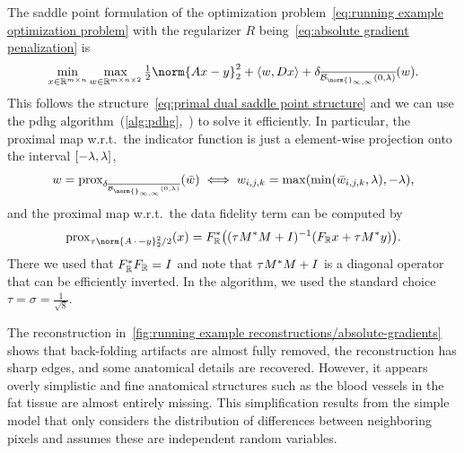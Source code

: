 The saddle point formulation of the optimization problem~\cref{eq:running example optimization problem} with the regularizer \( R \) being~\cref{eq:absolute gradient penalization} is
\begin{equation}
	\min_{\Signal \in \R^{\Height \times \Width}} \max_{w \in \R^{\Height \times \Width \times \num{2}}} \Half \norm{\Forward\Signal - \Data}_{\num{2}}^{\num{2}} + \inprod{w}{\DiffOp\Signal} +  \IndicatorFunction{\Closure{\Ball{\norm{}_{\infty,\infty}}{0}{\lambda}}}(w).
\end{equation}
This follows the structure~\cref{eq:primal dual saddle point structure} and we can use the \gls{pdhg} algorithm~(\cref{alg:pdhg},~\cite{chambolle_primal_2010}) to solve it efficiently.
In particular, the proximal map w.r.t.\ the indicator function is just a element-wise projection onto the interval \( \interval{-\lambda}{\lambda} \),
\begin{equation}
	w = \prox_{\IndicatorFunction{\Closure{\Ball{\norm{}_{\infty,\infty}}{0}{\lambda}}}}(\bar{w}) \iff w_{i,j,k} = \max(\min(\bar{w}_{i,j,k}, \lambda), -\lambda),
\end{equation}
and the proximal map w.r.t.\ the data fidelity term can be computed by
\begin{equation}
	\prox_{\tau\norm{\Forward\argm - \Data}_{\num{2}}^{\num{2}}/\num{2}}(x) = \Adjoint{\Fourier_{\R}}\bigl((\tau\Adjoint{\Mask}\Mask + \Identity)^{-1}(\Fourier_{\R} x + \tau\Adjoint{\Mask}\Data)\bigr).
	\label{eq:prox fourier data}
\end{equation}
There we used that \( F_{\mathbb{R}}^{\ast}F_{\mathbb{R}} = I \) and note that \( \tau M^{\ast}M + I \) is a diagonal operator that can be efficiently inverted.
In the algorithm, we used the standard choice \( \tau = \sigma = \frac{1}{\sqrt{8}} \).

The reconstruction in~\cref{fig:running example reconstructions/absolute-gradients} shows that back-folding artifacts are almost fully removed, the reconstruction has sharp edges, and some anatomical details are recovered.
However, it appears overly simplistic and fine anatomical structures such as the blood vessels in the fat tissue are almost entirely missing.
This simplification results from the simple model that only considers the distribution of differences between neighboring pixels and assumes these are independent random variables.

